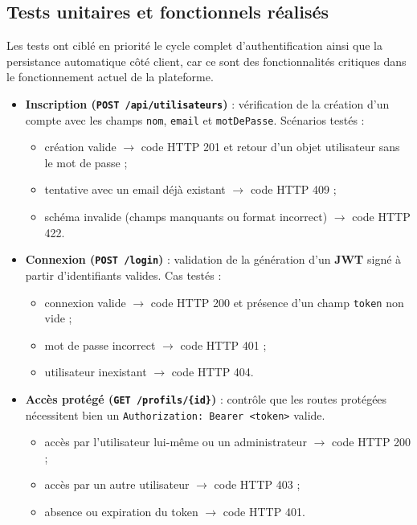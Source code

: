 \documentclass[12pt]{article}        %
\begin{document}
\subsection{Tests unitaires et fonctionnels réalisés}
\label{subsec:Tests}
Les tests ont ciblé en priorité le cycle complet d’authentification ainsi que la persistance automatique côté client, car ce sont des fonctionnalités critiques dans le fonctionnement actuel de la plateforme.
\begin{itemize}
    \item \textbf{Inscription (\texttt{POST /api/utilisateurs})} : vérification de la création d’un compte avec les champs \texttt{nom}, \texttt{email} et \texttt{motDePasse}. Scénarios testés :
    \begin{itemize}
      \item création valide $\rightarrow$ code HTTP 201 et retour d’un objet utilisateur sans le mot de passe ;
      \item tentative avec un email déjà existant $\rightarrow$ code HTTP 409 ;
      \item schéma invalide (champs manquants ou format incorrect) $\rightarrow$ code HTTP 422.
    \end{itemize}
    
    \item \textbf{Connexion (\texttt{POST /login})} : validation de la génération d’un \textbf{JWT} signé à partir d’identifiants valides. Cas testés :
    \begin{itemize}
      \item connexion valide $\rightarrow$ code HTTP 200 et présence d’un champ \texttt{token} non vide ;
      \item mot de passe incorrect $\rightarrow$ code HTTP 401 ;
      \item utilisateur inexistant $\rightarrow$ code HTTP 404.
    \end{itemize}

    \item \textbf{Accès protégé (\texttt{GET /profils/\{id\}})} : contrôle que les routes protégées nécessitent bien un \texttt{Authorization: Bearer <token>} valide.
    \begin{itemize}
      \item accès par l’utilisateur lui-même ou un administrateur $\rightarrow$ code HTTP 200 ;
      \item accès par un autre utilisateur $\rightarrow$ code HTTP 403 ;
      \item absence ou expiration du token $\rightarrow$ code HTTP 401.
    \end{itemize}
    

\end{itemize}
\end{document}
